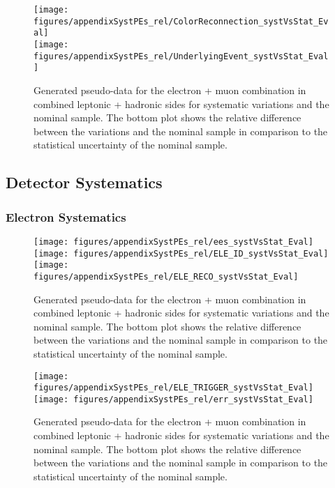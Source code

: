 \begin{figure}[!hb]
\begin{center}
        \texttt{[image: figures/appendixSystPEs\_rel/ColorReconnection\_systVsStat\_Eval]}\\
        \texttt{[image: figures/appendixSystPEs\_rel/UnderlyingEvent\_systVsStat\_Eval]}
\caption{Generated pseudo-data for the electron + muon combination in combined leptonic + hadronic sides for systematic variations and the nominal \ttbar sample. The bottom plot shows the relative difference between the variations and the nominal sample in comparison to the statistical uncertainty of the nominal sample.}   
\label{fig:systematicVar_lephad_modelling_2}
\end{center}
\end{figure}

\clearpage
\subsection{Detector Systematics}
\subsubsection{Electron Systematics}

\begin{figure}[!hb]
\begin{center}
        \texttt{[image: figures/appendixSystPEs\_rel/ees\_systVsStat\_Eval]}\\
        \texttt{[image: figures/appendixSystPEs\_rel/ELE\_ID\_systVsStat\_Eval]}\\
        \texttt{[image: figures/appendixSystPEs\_rel/ELE\_RECO\_systVsStat\_Eval]}
        
\caption{Generated pseudo-data for the electron + muon combination in combined leptonic + hadronic sides for systematic variations and the nominal \ttbar sample. The bottom plot shows the relative difference between the variations and the nominal sample in comparison to the statistical uncertainty of the nominal sample.}   
\label{fig:systematicVar_lephad_ELE_1}
\end{center}
\end{figure}

\begin{figure}[!hb]
\begin{center}
        \texttt{[image: figures/appendixSystPEs\_rel/ELE\_TRIGGER\_systVsStat\_Eval]}\\
        \texttt{[image: figures/appendixSystPEs\_rel/err\_systVsStat\_Eval]}
\caption{Generated pseudo-data for the electron + muon combination in combined leptonic + hadronic sides for systematic variations and the nominal \ttbar sample. The bottom plot shows the relative difference between the variations and the nominal sample in comparison to the statistical uncertainty of the nominal sample.}   
\label{fig:systematicVar_lephad_ELE_2}
\end{center}
\end{figure}


